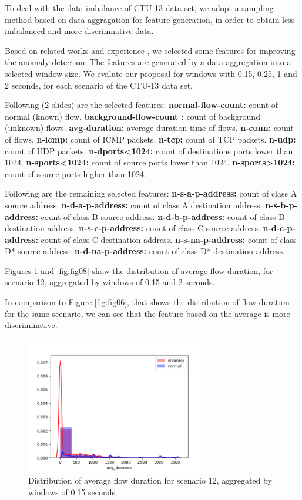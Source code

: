 \documentclass[review]{elsarticle}
\begin{document}
To deal with the data imbalance of CTU-13 data set, we adopt a sampling method based on data aggragation \cite{acarali2016survey} for feature generation, in order to obtain less imbalanced and more discrimnative data.	

Based on related works \cite{lakhina2005mining,chandrashekar2014survey,acarali2016survey} and experience \cite{vieira2017model, galibus2017offline}, we selected some features for improving the anomaly detection.
The features are generated by a data aggregation into a selected window size. We evalute our proposal for windows with 0.15, 0.25, 1 and 2 seconds, for each scenario of the CTU-13 data set.
	
Following (2 slides) are the selected features:
\textbf{normal-flow-count:} count of normal (known) flow.
\textbf{background-flow-count :} count of background (unknown) flows.
\textbf{avg-duration:} average duration time of flows.
\textbf{n-conn:} count of flows.
\textbf{n-icmp:} count of ICMP packets.
\textbf{n-tcp:} count of TCP packets.
\textbf{n-udp:} count of UDP packets.
\textbf{n-dports<1024:} count of destinations ports lower than 1024.
\textbf{n-sports<1024:} count of source ports lower than 1024.
\textbf{n-sports>1024:} count of source ports higher than 1024.

Following are the remaining selected features:
	\textbf{n-s-a-p-address:} count of class A source address.
	\textbf{n-d-a-p-address:} count of class A destination address.
	\textbf{n-s-b-p-address:} count of class B source address.
	\textbf{n-d-b-p-address:} count of class B destination address.
	\textbf{n-s-c-p-address:} count of class C source address.
	\textbf{n-d-c-p-address:} count of class C destination address.
	\textbf{n-s-na-p-address:} count of class D* source address.
	\textbf{n-d-na-p-address:} count of class D* destination address.

Figures \ref{fig:fig07} and \ref{fig:fig08} show the distribution of average flow duration, for scenario 12, aggregated by windows of 0.15 and 2 seconds.

In comparison to Figure \ref{fig:fig06}, that shows the distribution of flow duration for the same scenario, we can see that the feature based on the average is more discriminative.

\begin{figure}[h!]
     \centering
     \includegraphics[width=8cm]{figures/agg_distplot_0_15s_12_avg_duration.png}
     \caption{Distribution of average flow duration for scenario 12, aggregated by windows of 0.15 seconds.}
     \label{fig:fig07}
\end{figure}
\end{document}
